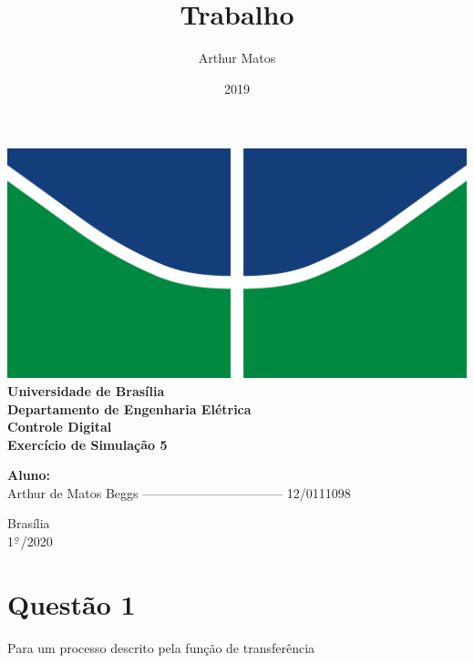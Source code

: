 \documentclass{article}
\title{Trabalho}
\author{Arthur Matos}
\date{2019}
\newcommand{\ubar}[1]{\underaccent{\bar}{#1}}
\begin{document}
\begin{titlepage}
    \begin{center}
        \centering
        \includegraphics[width=.7\linewidth]{images/LogoUnB.png}\\[0.5cm]
        {\large \textbf{Universidade de Brasília}}\\[0.2cm]
        {\large \textbf{Departamento de Engenharia Elétrica}}\\[0.2cm]
        {\large \textbf{Controle Digital}}\\[4.8cm]
        {\bf \huge {Exercício de Simulação 5}}\\[0.2cm]
        {\bf \large {}}
    \end{center}

    \vspace{5cm}
    \hspace{2cm} {\noindent \bf \large {Aluno:}}\\
    \vspace{0.8cm}
    \hspace{2.35cm} {\large Arthur de Matos Beggs --------------------------------- 12/0111098}\\[1cm]

    \begin{center}
        {\large Brasília}\\
        {\large 1$^{\ubar{\circ}}$/2020}
    \end{center}

\end{titlepage}
\clearpage
\setcounter{page}{2}
\clearpage



\section*{Questão 1}
    {Para um processo descrito pela função de transferência}
\end{document}
